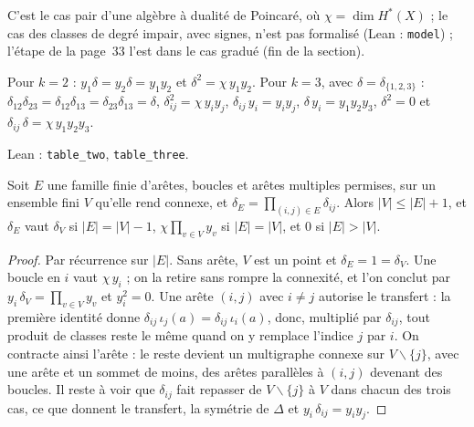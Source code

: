 C'est le cas pair d'une algèbre à dualité de Poincaré, où $\chi = \dim H^*(X)$ ; le cas des classes de degré impair, avec signes, n'est pas formalisé (Lean : \texttt{model}) ; l'étape de la page~33 l'est dans le cas gradué (fin de la section).

\begin{enonce}
Pour $k = 2$ : $y_1\delta = y_2\delta = y_1y_2$ et $\delta^2 = \chi\, y_1y_2$. Pour $k = 3$, avec $\delta = \delta_{\{1,2,3\}}$ : $\delta_{12}\delta_{23} = \delta_{12}\delta_{13} = \delta_{23}\delta_{13} = \delta$, $\delta_{ij}^2 = \chi\, y_iy_j$, $\delta_{ij}\,y_i = y_iy_j$, $\delta\, y_i = y_1y_2y_3$, $\delta^2 = 0$ et $\delta_{ij}\,\delta = \chi\, y_1y_2y_3$.
\end{enonce}

Lean : \texttt{table\_two}, \texttt{table\_three}.

\begin{encadre}
\begin{theoreme}\label{thm:11-graphes}
Soit $E$ une famille finie d'arêtes, boucles et arêtes multiples permises, sur un ensemble fini $V$ qu'elle rend connexe, et $\delta_E = \prod_{(i,j) \in E} \delta_{ij}$. Alors $|V| \leqslant |E| + 1$, et $\delta_E$ vaut $\delta_V$ si $|E| = |V| - 1$, $\chi \prod_{v \in V} y_v$ si $|E| = |V|$, et $0$ si $|E| > |V|$.
\end{theoreme}
\end{encadre}

\begin{proof}
Par récurrence sur $|E|$. Sans arête, $V$ est un point et $\delta_E = 1 = \delta_V$. Une boucle en $i$ vaut $\chi\, y_i$ ; on la retire sans rompre la connexité, et l'on conclut par $y_i\,\delta_V = \prod_{v \in V} y_v$ et $y_i^2 = 0$. Une arête $(i, j)$ avec $i \neq j$ autorise le transfert : la première identité donne $\delta_{ij}\,\iota_j(a) = \delta_{ij}\,\iota_i(a)$, donc, multiplié par $\delta_{ij}$, tout produit de classes reste le même quand on y remplace l'indice $j$ par $i$. On contracte ainsi l'arête : le reste devient un multigraphe connexe sur $V \smallsetminus \{j\}$, avec une arête et un sommet de moins, des arêtes parallèles à $(i,j)$ devenant des boucles. Il reste à voir que $\delta_{ij}$ fait repasser de $V \smallsetminus \{j\}$ à $V$ dans chacun des trois cas, ce que donnent le transfert, la symétrie de $\Delta$ et $y_i\,\delta_{ij} = y_iy_j$.
\end{proof}

